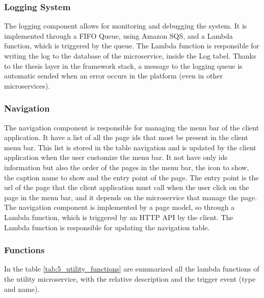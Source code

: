 \subsubsection{Logging System}
The logging component allows for monitoring and debugging the system. It is implemented through a
FIFO Queue, using Amazon SQS, and a Lambda function, which is triggered by the queue. The Lambda
function is responsible for writing the log to the database of the microservice, inside the Log
tabel. Thanks to the thesis layer in the framework stack, a message to the logging queue is
automatic sended when an error occurs in the platform (even in other microservices).

\subsubsection{Navigation}
The navigation component is responsible for managing the menu bar of the client application. It have
a list of all the page ids that most be present in the client menu bar. This list is stored in the
table navigation and is updated by the client application when the user customize the menu bar.
It not have only ids information but also the order of the pages in the menu bar, the icon to show,
the caption name to show and the entry point of the page. The entry point is the url of the page
that the client application must call when the user click on the page in the menu bar, and it depends
on the microservice that manage the page. The navigation component is implemented by a page model, so
through a Lambda function, which is triggered by an HTTP API by the client. The Lambda function is
responsible for updating the navigation table.

\subsubsection{Functions}
In the table \ref{tab:5_utility_functions} are summarized all the lambda functions of the utility
microservice, with the relative description and the trigger event (type and name).


